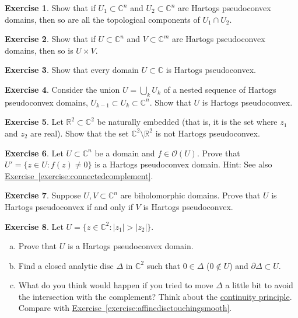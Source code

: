 \documentclass[12pt,openany]{book}
\newcommand{\sabs}[1]{\lvert {#1} \rvert}
\newcommand{\C}{{\mathbb{C}}}
\newcommand{\R}{{\mathbb{R}}}
\newcommand{\sO}{{\mathscr{O}}}
\theoremstyle{plain}
\theoremstyle{remark}
\theoremstyle{definition}
\newenvironment{exbox}{%
    \def\FrameCommand{\vrule width 1pt \relax\hspace{10pt}}%
    \MakeFramed{\advance\hsize-\width\FrameRestore}%
}{%
    \endMakeFramed
}
\newenvironment{exparts}{%
    \leavevmode\begin{enumerate}[a),noitemsep,topsep=0pt,parsep=0pt,partopsep=0pt]
}{%
    \end{enumerate}
}
\theoremstyle{exercise}
\newtheorem{exercise}{Exercise}[section]
\theoremstyle{example}
\newcommand{\exerciseref}[1]{\hyperref[#1]{Exercise~\ref*{#1}}}
\begin{document}
\begin{exbox}
\begin{exercise}
Show that if $U_1 \subset \C^n$ and $U_2 \subset \C^n$ are Hartogs
pseudoconvex domains, then so are all the topological components of $U_1 \cap U_2$.
\end{exercise}

\begin{exercise}
Show that if $U \subset \C^n$ and $V \subset \C^m$ are Hartogs
pseudoconvex domains, then so is $U \times V$.
\end{exercise}

\begin{exercise}
Show that every domain $U \subset \C$ is Hartogs pseudoconvex.
\end{exercise}

\begin{exercise} \label{exercise:nestedunions}
Consider the union $U = \bigcup_k U_k$ of a nested sequence of Hartogs pseudoconvex
domains, $U_{k-1} \subset U_k \subset \C^n$.  Show that $U$ is Hartogs pseudoconvex.
\end{exercise}

\begin{exercise}
Let $\R^2 \subset \C^2$ be naturally embedded (that is, it is the
set where $z_1$ and $z_2$ are real).  Show that the set $\C^2 \setminus
\R^2$ is not Hartogs pseudoconvex.
\end{exercise}

\begin{exercise}
Let $U \subset \C^n$ be a domain and $f \in \sO(U)$.  Prove that
$U' = \bigl\{ z \in U : f(z) \not= 0 \bigr\}$ is a Hartogs pseudoconvex
domain.  Hint: See also \exerciseref{exercise:connectedcomplement}.
\end{exercise}

\begin{exercise} \label{exercise:biholHartogs}
Suppose $U,V \subset \C^n$ are biholomorphic domains.
Prove that $U$ is Hartogs pseudoconvex if and only if $V$ is
Hartogs pseudoconvex.
\end{exercise}

\begin{exercise}
Let $U = \bigl\{ z \in \C^2 : \sabs{z_1} > \sabs{z_2} \bigr\}$.
\begin{exparts}
\item
Prove that $U$ is a Hartogs pseudoconvex domain.
\item
Find a closed analytic disc $\Delta$ in $\C^2$ such that $0 \in \Delta$ ($0
\notin U$)
and $\partial \Delta \subset U$.
\item
What do you think would happen if you tried to move $\Delta$ a
little bit to avoid the intersection with the complement?
Think about the \hyperref[thm:contprinciple]{continuity principle}.
Compare with \exerciseref{exercise:affinedisctouchingsmooth}.
\end{exparts}
\end{exercise}


\end{exbox}
\end{document}
